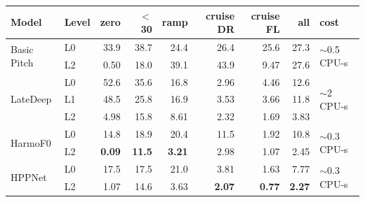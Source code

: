 \begin{tabular}{@{}llrrrrrrl@{}}
\toprule
Model & Level & zero & $<$30 & ramp & cruise DR & cruise FL & all & cost \\
\midrule
\multirow{2}{*}{Basic Pitch} & L0 & 33.9 & 38.7 & 24.4 & 26.4 & 25.6 & 27.3 & \multirow{2}{*}{$\sim$0.5 CPU-s} \\
 & L2 & 0.50 & 18.0 & 39.1 & 43.9 & 9.47 & 27.6 &  \\
\midrule
\multirow{3}{*}{LateDeep} & L0 & 52.6 & 35.6 & 16.8 & 2.96 & 4.46 & 12.6 & \multirow{3}{*}{$\sim$2 CPU-s} \\
 & L1 & 48.5 & 25.8 & 16.9 & 3.53 & 3.66 & 11.8 &  \\
 & L2 & 4.98 & 15.8 & 8.61 & 2.32 & 1.69 & 3.83 &  \\
\midrule
\multirow{2}{*}{HarmoF0} & L0 & 14.8 & 18.9 & 20.4 & 11.5 & 1.92 & 10.8 & \multirow{2}{*}{$\sim$0.3 CPU-s} \\
 & L2 & \textbf{0.09} & \textbf{11.5} & \textbf{3.21} & 2.98 & 1.07 & 2.45 &  \\
\midrule
\multirow{2}{*}{HPPNet} & L0 & 17.5 & 17.5 & 21.0 & 3.81 & 1.63 & 7.77 & \multirow{2}{*}{$\sim$0.3 CPU-s} \\
 & L2 & 1.07 & 14.6 & 3.63 & \textbf{2.07} & \textbf{0.77} & \textbf{2.27} &  \\
\bottomrule
\end{tabular}
